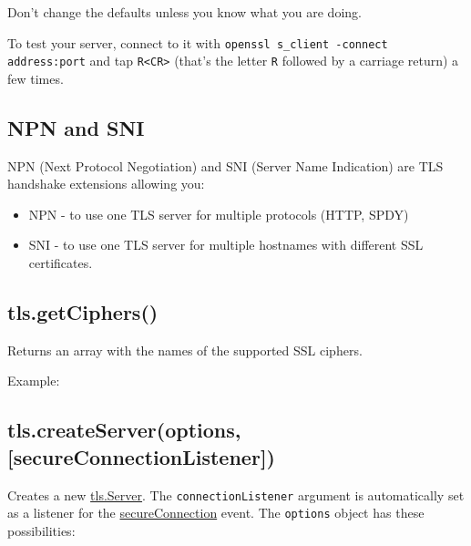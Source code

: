 Don't change the defaults unless you know what you are doing.

To test your server, connect to it with
\texttt{openssl s\_client -connect address:port} and tap
\texttt{R\textless{}CR\textgreater{}} (that's the letter \texttt{R}
followed by a carriage return) a few times.

\subsection{NPN and SNI}

NPN (Next Protocol Negotiation) and SNI (Server Name Indication) are TLS
handshake extensions allowing you:

\begin{itemize}
\item
  NPN - to use one TLS server for multiple protocols (HTTP, SPDY)
\item
  SNI - to use one TLS server for multiple hostnames with different SSL
  certificates.
\end{itemize}

\subsection{tls.getCiphers()}

Returns an array with the names of the supported SSL ciphers.

Example:

\begin{Shaded}
\begin{Highlighting}[]
 \NormalTok{();}
\end{Highlighting}
\end{Shaded}

\subsection{tls.createServer(options, {[}secureConnectionListener{]})}

Creates a new \hyperref[tls\_class\_tls\_server]{tls.Server}. The
\texttt{connectionListener} argument is automatically set as a listener
for the \hyperref[tls\_event\_secureconnection]{secureConnection} event.
The \texttt{options} object has these possibilities:

